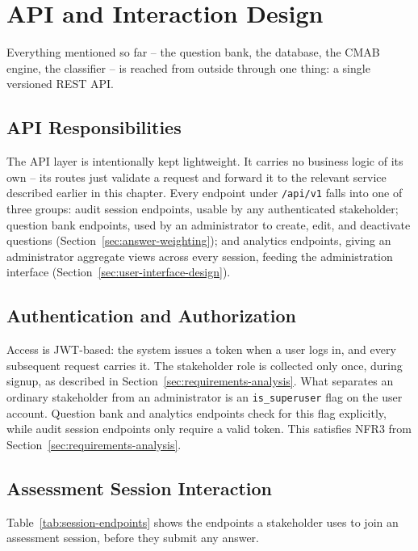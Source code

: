 \documentclass[a4paper, 12pt, oneside, openany, BCOR1cm,toc=chapterentrywithdots]{scrbook}
\begin{document}
\section{API and Interaction Design}
\label{sec:api-design}

Everything mentioned so far -- the question bank, the database, the CMAB engine, the classifier
-- is reached from outside through one thing: a single versioned REST API.

\subsection{API Responsibilities}

The API layer is intentionally kept lightweight. It carries no business logic of its own -- its
routes just validate a request and forward it to the relevant service described earlier in this
chapter. Every endpoint under \texttt{/api/v1} falls into one of three groups: audit session
endpoints, usable by any authenticated stakeholder; question bank endpoints, used by an
administrator to create, edit, and deactivate questions (Section~\ref{sec:answer-weighting}); and
analytics endpoints, giving an administrator aggregate views across every session, feeding the
administration interface (Section~\ref{sec:user-interface-design}).

\subsection{Authentication and Authorization}

Access is JWT-based: the system issues a token when a user logs in, and every subsequent request
carries it. The stakeholder role is collected only once, during signup, as described in
Section~\ref{sec:requirements-analysis}. What separates an ordinary stakeholder from an
administrator is an \texttt{is\_superuser} flag on the user account. Question bank and analytics
endpoints check for this flag explicitly, while audit session endpoints only require a valid
token. This satisfies NFR3 from Section~\ref{sec:requirements-analysis}.

\subsection{Assessment Session Interaction}

Table~\ref{tab:session-endpoints} shows the endpoints a stakeholder uses to join an assessment
session, before they submit any answer.
\end{document}
